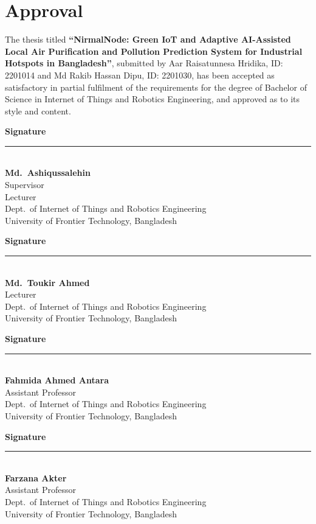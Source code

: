 \chapter*{Approval}

The thesis titled \textbf{``NirmalNode: Green IoT and Adaptive AI-Assisted Local Air Purification and Pollution Prediction System for Industrial Hotspots in Bangladesh''}, submitted by Aar Raisatunnesa Hridika, ID: 2201014 and Md Rakib Hassan Dipu, ID: 2201030, has been accepted as satisfactory in partial fulfilment of the requirements for the degree of Bachelor of Science in Internet of Things and Robotics Engineering, and approved as to its style and content.

\vspace{0.7cm}

\noindent
\begin{minipage}[t]{0.46\textwidth}
\textbf{Signature}\\[-0.1cm]
\rule{\linewidth}{0.4pt}\\[0.15cm]
\textbf{Md.\ Ashiqussalehin}\\
Supervisor\\
Lecturer\\
Dept.\ of Internet of Things and Robotics Engineering\\
University of Frontier Technology, Bangladesh
\end{minipage}
\hfill
\begin{minipage}[t]{0.46\textwidth}
\textbf{Signature}\\[-0.1cm]
\rule{\linewidth}{0.4pt}\\[0.15cm]
\textbf{Md.\ Toukir Ahmed}\\
Lecturer\\
Dept.\ of Internet of Things and Robotics Engineering\\
University of Frontier Technology, Bangladesh
\end{minipage}

\vspace{0.65cm}

\noindent
\begin{minipage}[t]{0.46\textwidth}
\textbf{Signature}\\[-0.1cm]
\rule{\linewidth}{0.4pt}\\[0.15cm]
\textbf{Fahmida Ahmed Antara}\\
Assistant Professor\\
Dept.\ of Internet of Things and Robotics Engineering\\
University of Frontier Technology, Bangladesh
\end{minipage}
\hfill
\begin{minipage}[t]{0.46\textwidth}
\textbf{Signature}\\[-0.1cm]
\rule{\linewidth}{0.4pt}\\[0.15cm]
\textbf{Farzana Akter}\\
Assistant Professor\\
Dept.\ of Internet of Things and Robotics Engineering\\
University of Frontier Technology, Bangladesh
\end{minipage}

